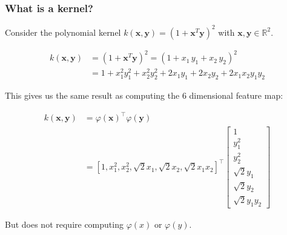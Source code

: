 \documentclass{beamer}
\begin{document}
    \begin{frame}
        \frametitle{What is a kernel?}
        Consider the polynomial kernel $k(\mathbf x, \mathbf y) = (1 + \mathbf x^T \mathbf y)^2$ with $\mathbf x, \mathbf y \in \mathbb R^2$.

        \begin{align}
            k(\mathbf x, \mathbf y) & = (1 + \mathbf x^T \mathbf y)^2 = (1 + x_1 \, y_1 + x_2 \, y_2)^2 \\
            & = 1 + x_1^2 y_1^2 + x_2^2 y_2^2 + 2 x_1 y_1 + 2 x_2 y_2 + 2 x_1 x_2 y_1 y_2
        \end{align}

        This gives us the same result as computing the 6 dimensional feature map:

        \begin{align}
            k(\mathbf x, \mathbf y) &= \varphi(\mathbf x)^\intercal \varphi(\mathbf y) \\
            &=[1, x_1^2, x_2^2, \sqrt{2} x_1, \sqrt{2} x_2, \sqrt{2} x_1 x_2]^\intercal\begin{bmatrix}
                                                                                           1\\ y_1^2\\ y_2^2\\ \sqrt{2} y_1\\ \sqrt{2} y_2\\ \sqrt{2} y_1 y_2
            \end{bmatrix}
        \end{align}

        But does not require computing $\varphi(x)$ or $\varphi(y)$.
    \end{frame}
\end{document}
